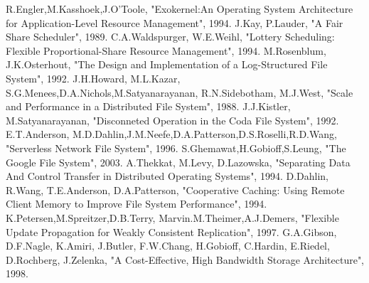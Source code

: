 {\begin{thebibliography}{9}
   R.Engler,M.Kasshoek,J.O'Toole, "Exokernel:An Operating System Architecture for Application-Level Resource Management", 1994.
	 J.Kay, P.Lauder, "A Fair Share Scheduler", 1989.
	 C.A.Waldspurger, W.E.Weihl, "Lottery Scheduling: Flexible Proportional-Share Resource Management", 1994.
	 M.Rosenblum, J.K.Osterhout, "The Design and Implementation of a Log-Structured File System", 1992.
	 J.H.Howard, M.L.Kazar, S.G.Menees,D.A.Nichols,M.Satyanarayanan, R.N.Sidebotham, M.J.West, "Scale and Performance in a Distributed File System", 1988.
	 J.J.Kistler, M.Satyanarayanan, "Disconneted Operation in the Coda File System", 1992.
	 E.T.Anderson, M.D.Dahlin,J.M.Neefe,D.A.Patterson,D.S.Roselli,R.D.Wang, "Serverless Network File System", 1996.
	 S.Ghemawat,H.Gobioff,S.Leung, "The Google File System", 2003.
	 A.Thekkat, M.Levy, D.Lazowska, "Separating Data And Control Transfer in Distributed Operating Systems", 1994.
	 D.Dahlin, R.Wang, T.E.Anderson, D.A.Patterson, "Cooperative Caching: Using Remote Client Memory to Improve File System Performance", 1994.
	 K.Petersen,M.Spreitzer,D.B.Terry, Marvin.M.Theimer,A.J.Demers, "Flexible Update Propagation for Weakly Consistent Replication", 1997.
	 G.A.Gibson, D.F.Nagle, K.Amiri, J.Butler, F.W.Chang, H.Gobioff, C.Hardin, E.Riedel, D.Rochberg, J.Zelenka, "A Cost-Effective, High Bandwidth Storage Architecture", 1998.
\end{thebibliography}
}

